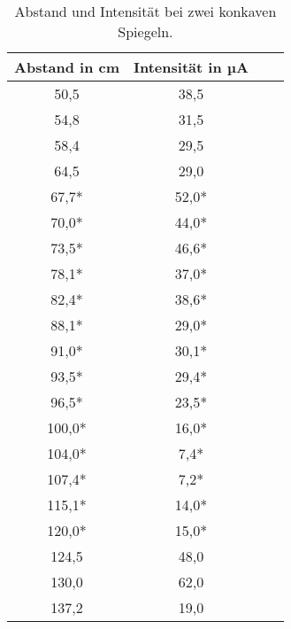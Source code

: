       \begin{table}
        \centering
        \begin{tabular}{c c c c}
          \toprule
          Abstand in cm & Intensität in µA\\
          \midrule
              50,5    & 38,5  \\
              54,8    & 31,5  \\
              58,4    & 29,5  \\
              64,5    & 29,0  \\
              67,7*   & 52,0* \\
              70,0*   & 44,0* \\
              73,5*   & 46,6* \\
              78,1*   & 37,0* \\
              82,4*   & 38,6* \\
              88,1*   & 29,0* \\
              91,0*   & 30,1* \\
              93,5*   & 29,4* \\
              96,5*   & 23,5* \\
              100,0*  & 16,0* \\
              104,0*  &  7,4* \\
              107,4*  &  7,2* \\
              115,1*  & 14,0* \\
              120,0*  & 15,0* \\
              124,5   & 48,0  \\
              130,0   & 62,0  \\
              137,2   & 19,0  \\
          \bottomrule
        \end{tabular}
        \caption{Abstand und Intensität bei zwei konkaven Spiegeln.}
        \label{tab:konkavkonkav}
      \end{table}

